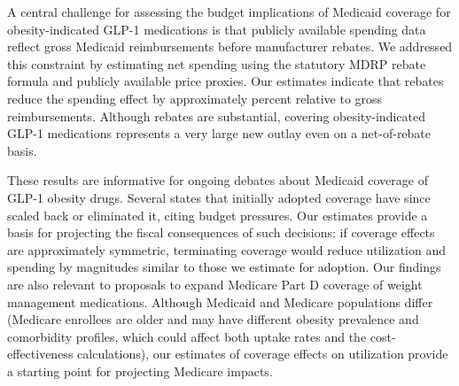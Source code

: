A central challenge for assessing the budget implications of Medicaid coverage for obesity-indicated GLP-1 medications is that publicly available spending data reflect gross Medicaid reimbursements before manufacturer rebates. We addressed this constraint by estimating net spending using the statutory MDRP rebate formula and publicly available price proxies. Our estimates indicate that rebates reduce the spending effect by approximately \spReductionObSevenNineEmw{} percent relative to gross reimbursements. Although rebates are substantial, covering obesity-indicated GLP-1 medications represents a very large new outlay even on a net-of-rebate basis. 

These results are informative for ongoing debates about Medicaid coverage of GLP-1 obesity drugs. Several states that initially adopted coverage have since scaled back or eliminated it, citing budget pressures. Our estimates provide a basis for projecting the fiscal consequences of such decisions: if coverage effects are approximately symmetric, terminating coverage would reduce utilization and spending by magnitudes similar to those we estimate for adoption. Our findings are also relevant to proposals to expand Medicare Part D coverage of weight management medications. Although Medicaid and Medicare populations differ (Medicare enrollees are older and may have different obesity prevalence and comorbidity profiles, which could affect both uptake rates and the cost-effectiveness calculations), our estimates of coverage effects on utilization provide a starting point for projecting Medicare impacts. 

